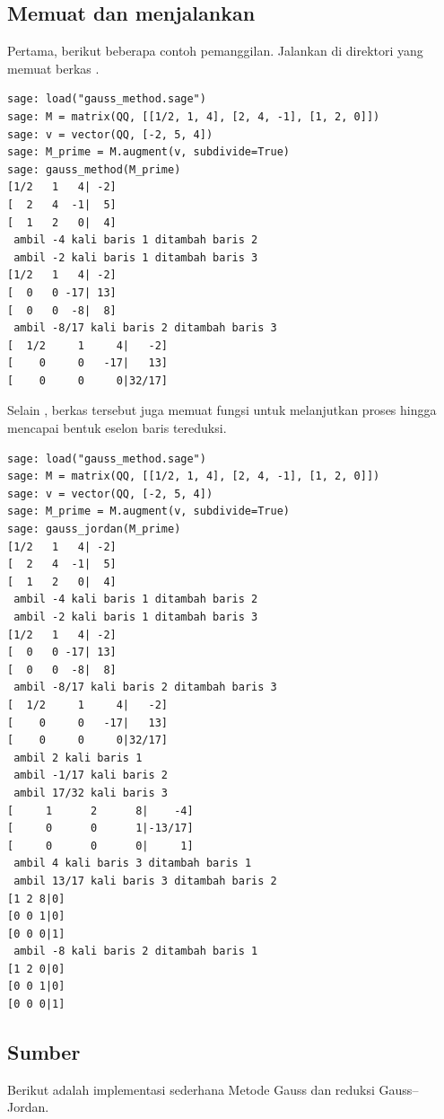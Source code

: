 \subsection{Memuat dan menjalankan}
Pertama, berikut beberapa contoh pemanggilan.
Jalankan \Sage{} di direktori yang memuat berkas .
\begin{lstlisting}
sage: load("gauss_method.sage")                                                 
sage: M = matrix(QQ, [[1/2, 1, 4], [2, 4, -1], [1, 2, 0]])                      
sage: v = vector(QQ, [-2, 5, 4])                                                
sage: M_prime = M.augment(v, subdivide=True)                                    
sage: gauss_method(M_prime)                                                     
[1/2   1   4| -2]
[  2   4  -1|  5]
[  1   2   0|  4]
 ambil -4 kali baris 1 ditambah baris 2
 ambil -2 kali baris 1 ditambah baris 3
[1/2   1   4| -2]
[  0   0 -17| 13]
[  0   0  -8|  8]
 ambil -8/17 kali baris 2 ditambah baris 3
[  1/2     1     4|   -2]
[    0     0   -17|   13]
[    0     0     0|32/17]
\end{lstlisting}

Selain \!, berkas tersebut juga memuat fungsi
untuk melanjutkan proses hingga mencapai bentuk eselon baris tereduksi.
\begin{lstlisting}
sage: load("gauss_method.sage")                                                 
sage: M = matrix(QQ, [[1/2, 1, 4], [2, 4, -1], [1, 2, 0]])                      
sage: v = vector(QQ, [-2, 5, 4])                                                
sage: M_prime = M.augment(v, subdivide=True)                                    
sage: gauss_jordan(M_prime)                                                     
[1/2   1   4| -2]
[  2   4  -1|  5]
[  1   2   0|  4]
 ambil -4 kali baris 1 ditambah baris 2
 ambil -2 kali baris 1 ditambah baris 3
[1/2   1   4| -2]
[  0   0 -17| 13]
[  0   0  -8|  8]
 ambil -8/17 kali baris 2 ditambah baris 3
[  1/2     1     4|   -2]
[    0     0   -17|   13]
[    0     0     0|32/17]
 ambil 2 kali baris 1
 ambil -1/17 kali baris 2
 ambil 17/32 kali baris 3
[     1      2      8|    -4]
[     0      0      1|-13/17]
[     0      0      0|     1]
 ambil 4 kali baris 3 ditambah baris 1
 ambil 13/17 kali baris 3 ditambah baris 2
[1 2 8|0]
[0 0 1|0]
[0 0 0|1]
 ambil -8 kali baris 2 ditambah baris 1
[1 2 0|0]
[0 0 1|0]
[0 0 0|1]
\end{lstlisting}



\subsection{Sumber \protect{}}

Berikut adalah implementasi sederhana Metode Gauss dan
reduksi Gauss--Jordan.


\endinput


TODO:
